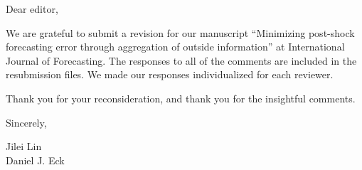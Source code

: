 \documentclass[11pt]{article}
\begin{document}
\footnotesize

\normalsize 


Dear editor,

We are grateful to submit a revision for our manuscript ``Minimizing post-shock forecasting error through aggregation of outside information'' at International Journal of Forecasting.  The responses to all of the comments are included in the resubmission files. We made our responses individualized for each reviewer.

Thank you for your reconsideration, and thank you for the insightful comments.



Sincerely,

Jilei Lin \\
Daniel J. Eck 
\end{document}
